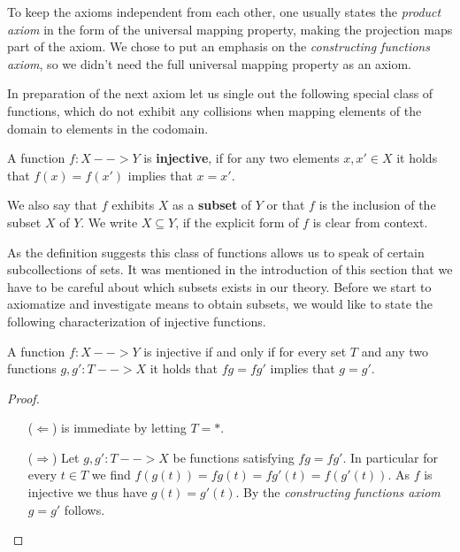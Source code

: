 	\begin{remark}
		To keep the axioms independent from each other, one usually states the \textit{product axiom} in the form of the universal mapping property, making the projection maps part of the axiom. We chose to put an emphasis on the \textit{constructing functions axiom}, so we didn't need the full universal mapping property as an axiom.
	\end{remark}

	In preparation of the next axiom let us single out the following special class of functions, which do not exhibit any collisions when mapping elements of the domain to elements in the codomain.

	\begin{definition}
		A function $f:X --> Y$ is \textbf{injective}, if for any two elements $x,x' \in X$ it holds that $f(x)=f(x')$ implies that $x=x'$. 

		We also say that $f$ exhibits $X$ as a \textbf{subset} of $Y$ or that $f$ is the inclusion of the subset $X$ of $Y$. We write $X \subseteq Y$, if the explicit form of $f$ is clear from context. 
	\end{definition}

	As the definition suggests this class of functions allows us to speak of certain subcollections of sets. It was mentioned in the introduction of this section that we have to be careful about which subsets exists in our theory. Before we start to axiomatize and investigate means to obtain subsets, we would like to state the following characterization of injective functions.

	\begin{lemma}
		A function $f:X --> Y$ is injective if and only if for every set $T$ and any two functions $g,g': T --> X$ it holds that $fg = fg'$ implies that $g=g'$.
	\end{lemma}
	\begin{proof}
		\begin{enumerate}
			\item[($\Leftarrow$)]{
				is immediate by letting $T=*$.
			}
			\item[($\Rightarrow$)]{
				Let $g,g':T --> X$ be functions satisfying $fg=fg'$. In particular for every $t \in T$ we find $f(g(t)) = fg(t) = fg'(t) = f(g'(t))$. As $f$ is injective we thus have $g(t)=g'(t)$. By the \textit{constructing functions axiom} $g=g'$ follows.
			}\vspace{-1.5em}
		\end{enumerate}
	\end{proof}

